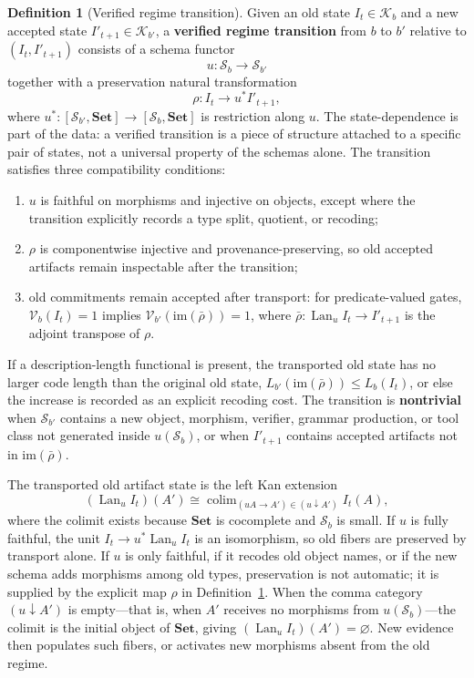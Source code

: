 \documentclass[11pt]{article}
\theoremstyle{definition}
\newtheorem{definition}{Definition}
\newcommand{\K}{\mathcal{K}}
\newcommand{\Sschema}{\mathcal{S}}
\newcommand{\V}{\mathcal{V}}
\newcommand{\Set}{\mathbf{Set}}
\newcommand{\Lan}{\operatorname{Lan}}
\newcommand{\colim}{\operatorname{colim}}
\begin{document}
\begin{definition}[Verified regime transition]
\label{def:transition}
Given an old state $I_t\in\K_b$ and a new accepted state $I'_{t+1}\in\K_{b'}$, a \textbf{verified regime transition} from $b$ to $b'$ relative to $(I_t,I'_{t+1})$ consists of a schema functor
\[
u:\Sschema_b\to\Sschema_{b'}
\]
together with a preservation natural transformation
\[
\rho:I_t\longrightarrow u^*I'_{t+1},
\]
where $u^*:[\Sschema_{b'},\Set]\to[\Sschema_b,\Set]$ is restriction along $u$. The state-dependence is part of the data: a verified transition is a piece of structure attached to a specific pair of states, not a universal property of the schemas alone. The transition satisfies three compatibility conditions:
\begin{enumerate}[leftmargin=1.7em,topsep=2pt,itemsep=2pt]
    \item $u$ is faithful on morphisms and injective on objects, except where the transition explicitly records a type split, quotient, or recoding;
    \item $\rho$ is componentwise injective and provenance-preserving, so old accepted artifacts remain inspectable after the transition;
    \item old commitments remain accepted after transport: for predicate-valued gates, $\V_b(I_t)=1$ implies $\V_{b'}(\mathrm{im}(\bar\rho))=1$, where $\bar\rho:\Lan_uI_t\to I'_{t+1}$ is the adjoint transpose of $\rho$.
\end{enumerate}
If a description-length functional is present, the transported old state has no larger code length than the original old state, $L_{b'}(\mathrm{im}(\bar\rho))\le L_b(I_t)$, or else the increase is recorded as an explicit recoding cost. The transition is \textbf{nontrivial} when $\Sschema_{b'}$ contains a new object, morphism, verifier, grammar production, or tool class not generated inside $u(\Sschema_b)$, or when $I'_{t+1}$ contains accepted artifacts not in $\mathrm{im}(\bar\rho)$.
\end{definition}

The transported old artifact state is the left Kan extension
\begin{equation}
(\Lan_u I_t)(A') \cong \colim_{(uA\to A')\in(u\downarrow A')} I_t(A),
\label{eq:lan_formula}
\end{equation}
where the colimit exists because $\Set$ is cocomplete and $\Sschema_b$ is small. If $u$ is fully faithful, the unit $I_t\to u^*\Lan_u I_t$ is an isomorphism, so old fibers are preserved by transport alone. If $u$ is only faithful, if it recodes old object names, or if the new schema adds morphisms among old types, preservation is not automatic; it is supplied by the explicit map $\rho$ in Definition~\ref{def:transition}. When the comma category $(u\downarrow A')$ is empty---that is, when $A'$ receives no morphisms from $u(\Sschema_b)$---the colimit is the initial object of $\Set$, giving $(\Lan_u I_t)(A')=\varnothing$. New evidence then populates such fibers, or activates new morphisms absent from the old regime.
\end{document}
